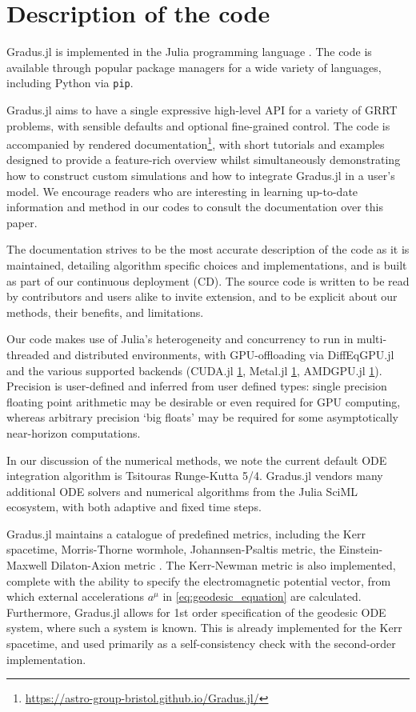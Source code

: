 \section{Description of the code}

Gradus.jl is implemented in the Julia programming language \citep{Bezanson_Julia_A_fresh_2017}. The code is available through popular package managers for a wide variety of languages, including Python via \texttt{pip}.

Gradus.jl aims to have a single expressive high-level API for a variety of GRRT problems, with sensible defaults and optional fine-grained control. The code is accompanied by rendered documentation\footnote{\url{https://astro-group-bristol.github.io/Gradus.jl/}}, with short tutorials and examples designed to provide a feature-rich overview whilst simultaneously demonstrating how to construct custom simulations and how to integrate Gradus.jl in a user's model. We encourage readers who are interesting in learning up-to-date information and method in our codes to consult the documentation over this paper. 

The documentation strives to be the most accurate description of the code as it is maintained, detailing algorithm specific choices and implementations, and is built as part of our continuous deployment (CD). The source code is written to be read by contributors and users alike to invite extension, and to be explicit about our methods, their benefits, and limitations.

Our code makes use of Julia's heterogeneity and concurrency to run in multi-threaded and distributed environments, with GPU-offloading via DiffEqGPU.jl and the various supported backends (CUDA.jl \ref{}, Metal.jl \ref{}, AMDGPU.jl \ref{}). Precision is user-defined and inferred from user defined types: single precision floating point arithmetic may be desirable or even required for GPU computing, whereas arbitrary precision `big floats' may be required for some asymptotically near-horizon computations.

In our discussion of the numerical methods, we note the current default ODE integration algorithm is Tsitouras Runge-Kutta 5/4. Gradus.jl vendors many additional ODE solvers and numerical algorithms from the Julia SciML ecosystem, with both adaptive and fixed time steps.

Gradus.jl maintains a catalogue of predefined metrics, including the Kerr spacetime, Morris-Thorne wormhole, Johannsen-Psaltis metric, the Einstein-Maxwell Dilaton-Axion metric . The Kerr-Newman metric is also implemented, complete with the ability to specify the electromagnetic potential vector, from which external accelerations $a^\mu$ in \eqref{eq:geodesic_equation} are calculated. Furthermore, Gradus.jl allows for 1st order specification of the geodesic ODE system, where such a system is known. This is already implemented for the Kerr spacetime, and used primarily as a self-consistency check with the second-order implementation.

